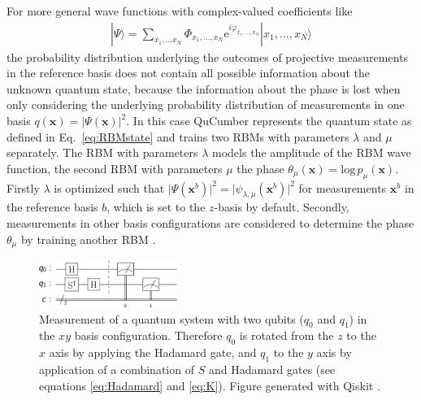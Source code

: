 \documentclass[pra,aps,showpacs,groupedaddress,superscriptaddress,twocolumn,toc=flat,biblatex,footinbib]{revtex4-1}
\newcommand{\ket}[1]{|#1\rangle}
\renewcommand{\vec}[1]{\bm{#1}}
\begin{document}
For more general wave functions with complex-valued coefficients like
\begin{align}
\ket{\Psi} = \sum_{x_1, \dots x_N} \Phi_{x_1, \dots, x_N} \mathrm{e}^{i\varphi_{x_1, \dots, x_N}}\ket{x_1, \dots, x_N}
\label{eq:complex_psi}
\end{align}
the probability distribution underlying the outcomes of projective
measurements in the reference basis does not contain all possible information about the unknown quantum state, because the information about the phase is lost when only considering the underlying probability distribution of measurements in one basis $q(\vec{x})=\vert \Psi (\vec{x})\vert^2$. In this case QuCumber represents the quantum state as defined in Eq.~\eqref{eq:RBMstate}
and trains two RBMs with parameters $\lambda$ and $\mu$ separately. The RBM with parameters $\lambda$ models the amplitude of the RBM wave function, the second RBM with parameters $\mu$ the phase $\theta_\mu(\vec{x}) = \mathrm{log}\, p_\mu(\vec{x})$. Firstly $\lambda$ is optimized such that $\vert \Psi (\vec{x}^b)\vert ^2 = \vert \psi_{\lambda, \mu} (\vec{x}^b)\vert ^2 $ for measurements $\vec{x}^b$ in the reference basis $b$, which is set to the $z$-basis by default. Secondly, measurements in other basis configurations are considered to determine the phase $\theta_\mu$ by training another RBM \cite{Torlai2018}.\\

\begin{figure}[t!]
	\centering
  \includegraphics[width=0.4\textwidth]{Paper/Graphics/xy_measurement.pdf}
	\caption[Measurement of a quantum circuit in the $xy$ basis configuration]{Measurement of a quantum system with two qubits ($q_0$ and $q_1$) in the $xy$ basis configuration. Therefore $q_0$ is rotated from the $z$ to the $x$ axis by applying the Hadamard gate, and $q_1$ to the $y$ axis by application of a combination of $S$ and Hadamard gates (see equations \eqref{eq:Hadamard} and \eqref{eq:K}). Figure generated with Qiskit \cite{Qiskit2010}.}
	\label{fig:Configs}
\end{figure}
\end{document}
